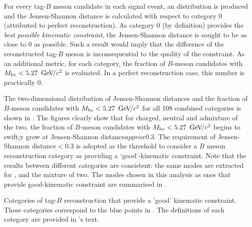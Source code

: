For every tag-$B$ meson candidate in each signal \MC event, an \Mbc distribution is produced 
and the Jensen-Shannon distance is calculated with respect to category 0 (attributed to perfect reconstruction).
As category 0 (by definition) provides the \textit{best possible kinematic constraint}, the Jensen-Shannon distance is sought to be as close to 0 as possible.
Such a result would imply that the difference of the reconstructed tag-$B$ meson is inconsequential to the quality of the constraint.
As an additional metric, for each category, the fraction of $B$-meson candidates with ${M_{\mathrm{bc}}}<5.27~{\mathrm{\,Ge\kern -0.1em V\!/}c^2}$ is evaluated.
In a perfect reconstruction case, this number is practically 0.

The two-dimensional distribution of Jensen-Shannon distances and the fraction of $B$-meson candidates with ${M_{\mathrm{bc}}}<5.27~{\mathrm{\,Ge\kern -0.1em V\!/}c^2}$
for all 108 combined categories is shown in .
The figures clearly show that for charged, neutral and admixture of the two, the fraction of $B$-meson candidates with ${M_{\mathrm{bc}}}<5.27~{\mathrm{\,Ge\kern -0.1em V\!/}c^2}$ begins to swift;y grow at Jensen-Shannon distance$approx0.3$.
The requirement of Jensen-Shannon distance$<0.3$ is adopted as the threshold to consider a $B$ meson reconstruction category as providing a `good'-kinematic constraint.
Note that the results between different categories are consistent: the same modes are extracted for \Bp, \Bz and the mixture of two.
The modes chosen in this analysis as ones that provide good-kinematic constraint are summarised in .

\begin{table}[htbp!]
    \centering
    \caption{\label{tab:error_codes}Categories of tag-$B$ reconstruction that provide a 'good' kinematic constraint.
    These categories correspond to the blue points in .
    The definitions of each category are provided in 's text.
    }
    
\end{table}

